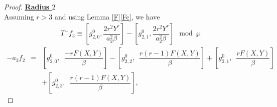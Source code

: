 \documentclass[11pt, reqno]{amsart}
\numberwithin{equation}{section}
\theoremstyle{definition}
\theoremstyle{remark}
\theoremstyle{definition}
\theoremstyle{remark}
\theoremstyle{remark}
\begin{document}
\begin{proof}
\noindent\textbf{\underline{Radius $2$}}\\
Assuming $r>3$ and using Lemma \ref{F}\ref{Fc},
 we have 
 \begin{eqnarray}
   T^-f_{3} 
 \equiv
   \left[g_{2,0}^0, \dfrac{2r^2Y^r}{a_2^2\beta} \right] -\left[g_{2,1}^{0},  \dfrac{2r^2Y^r}{a_2^2\beta} \right]\mod\wp
   \label{T-f3}   
\end{eqnarray}
 \begin{eqnarray}\label{a2f2}
   -a_2f_{2} &=& \left[g_{2,0}^0,\enspace \dfrac{-rF(X,Y)}{\beta}\right]-\left[g_{2,2}^0, \enspace \dfrac{r(r-1)F(X,Y)}{\beta}\right]+\left[g_{2,1}^0,\enspace \dfrac{rF(X,Y)}{\beta}\right]\nonumber\\ & &+\left[g_{2,3}^0,\enspace \dfrac{r(r-1)F(X,Y)}{\beta}\right], %

\end{eqnarray}
\end{proof}
\end{document}
